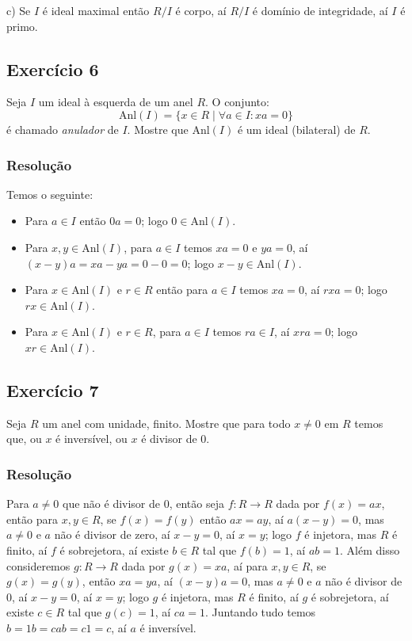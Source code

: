 \documentclass[10pt,a4paper]{article}
\begin{document}
\medskip
\noindent
c) Se $I$ é ideal maximal então $R/I$ é corpo, aí $R/I$ é domínio de integridade, aí $I$ é primo.

\subsection*{Exercício 6}

Seja $I$ um ideal à esquerda de um anel $R$. O conjunto:
\[
\mathrm{Anl}(I)=\{x\in R\mid\forall a\in I:xa=0\}
\]
é chamado \textit{anulador} de $I$. Mostre que $\mathrm{Anl}(I)$ é um ideal (bilateral) de $R$.

\subsubsection*{Resolução}

Temos o seguinte:
\begin{itemize}
\item Para $a\in I$ então $0a=0$; logo $0\in\mathrm{Anl}(I)$.
\item Para $x,y\in\mathrm{Anl}(I)$, para $a\in I$ temos $xa=0$ e $ya=0$, aí $(x-y)a=xa-ya=0-0=0$; logo $x-y\in\mathrm{Anl}(I)$.
\item Para $x\in\mathrm{Anl}(I)$ e $r\in R$ então para $a\in I$ temos $xa=0$, aí $rxa=0$; logo $rx\in\mathrm{Anl}(I)$.
\item Para $x\in\mathrm{Anl}(I)$ e $r\in R$, para $a\in I$ temos $ra\in I$, aí $xra=0$; logo $xr\in\mathrm{Anl}(I)$.
\end{itemize}

\subsection*{Exercício 7}

Seja $R$ um anel com unidade, finito. Mostre que para todo $x\neq 0$ em $R$ temos que, ou $x$ é inversível, ou $x$ é divisor de $0$.

\subsubsection*{Resolução}

Para $a\neq 0$ que não é divisor de $0$, então seja $f:R\rightarrow R$ dada por $f(x)=ax$, então para $x,y\in R$, se $f(x)=f(y)$ então $ax=ay$, aí $a(x-y)=0$, mas $a\neq 0$ e $a$ não é divisor de zero, aí $x-y=0$, aí $x=y$; logo $f$ é injetora, mas $R$ é finito, aí $f$ é sobrejetora, aí existe $b\in R$ tal que $f(b)=1$, aí $ab=1$. Além disso consideremos $g:R\rightarrow R$ dada por $g(x)=xa$, aí para $x,y\in R$, se $g(x)=g(y)$, então $xa=ya$, aí $(x-y)a=0$, mas $a\neq 0$ e $a$ não é divisor de $0$, aí $x-y=0$, aí $x=y$; logo $g$ é injetora, mas $R$ é finito, aí $g$ é sobrejetora, aí existe $c\in R$ tal que $g(c)=1$, aí $ca=1$. Juntando tudo temos $b=1b=cab=c1=c$, aí $a$ é inversível.
\end{document}
